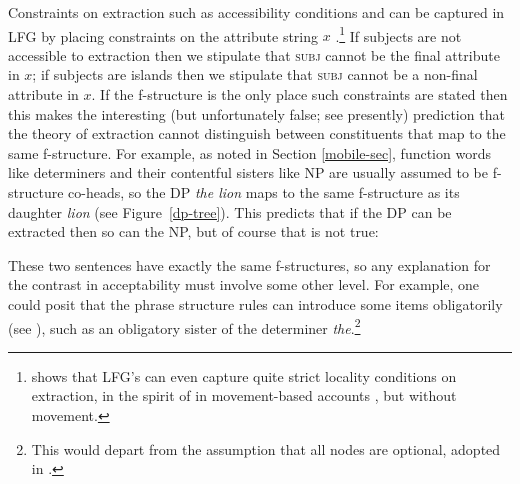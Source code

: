 \begin{sloppypar} 
Constraints on extraction such as accessibility conditions and   can be captured in LFG by placing constraints on the attribute string \ensuremath{x} \citep{dalrymple;ea19}.\footnote{\citet{asudeh-lpr} shows that LFG's  \citep[225--230]{dalrymple;ea19} can even capture quite strict locality conditions on extraction, in the spirit of  in movement-based accounts \citep{Chomsky73a,Chomsky77a-u}, but without movement.} If subjects are not accessible to extraction then we stipulate that \textsc{subj} cannot be the final attribute in \ensuremath{x}; if subjects are islands then we stipulate that \textsc{subj} cannot be a non-final attribute in \ensuremath{x}.  If the f-structure is the only place such constraints are stated then 
this makes the interesting (but unfortunately false; see presently) prediction that the theory of extraction cannot distinguish between constituents that map to the same f-structure.  For example, as noted in Section \ref{mobile-sec}, function words like determiners and their contentful sisters like NP are usually assumed to be f-structure co-heads, so the DP \textit{the lion} maps to the same f-structure as its daughter \textit{lion} (see  Figure~\ref{dp-tree}).  This predicts that if the DP can be extracted then so can the NP, but of course that is not true:
\end{sloppypar}

\begin{exe} 
\ex	\label{nope}
\begin{xlist}
\end{xlist}
\end{exe}
These two sentences have exactly the same f-structures, so any explanation for the contrast in acceptability must involve some other level.  For example, one could posit that the phrase structure rules can introduce some items obligatorily (see \citealt[239]{snijders15}), such as an obligatory sister of the determiner \textit{the}.\footnote{This would depart from the assumption that all nodes are optional, adopted in \citet{BATW2016a}.} 


%

